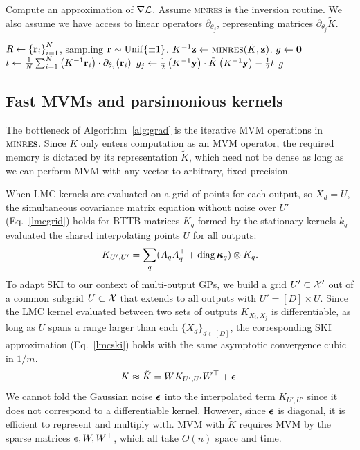 \documentclass[twoside]{article}
\begin{document}
\begin{algorithm}[!ht]
  \caption{Compute an approximation of $\nabla \mathcal{L}$. Assume \textsc{minres} is the inversion routine. We also assume we have access to linear operators $\partial_{\theta_j}$, representing matrices $\partial_{\theta_j}\tilde{K}$.} \label{alg:grad}
\begin{algorithmic}[1]
  \State $R\gets\left\{ {\textbf{r}}_i \right\}_{ i=1 }^{ N }$, sampling ${\textbf{r}}\sim\operatorname{Unif}\{\pm 1\}$.
\State $K^{-1}\textbf{z}\gets\textsc{minres}(\tilde{K},\textbf{z})$.
\EndFor
\State $g\gets \textbf{0}$
\State $t\gets \frac{1}{N}\sum_{i=1}^{N}\left({K^{-1}{\textbf{r}}_i}\right)\cdot \partial_{\theta_j}({\textbf{r}}_i)$
\State $g_j\gets \frac{1}{2}\left({K^{-1}\textbf{y}}\right)\cdot \tilde{K}\left({K^{-1}\textbf{y}}\right)-\frac{1}{2}t$
\EndFor
\State \Return $g$ 
\EndProcedure
\end{algorithmic}
\end{algorithm}

\subsection{Fast MVMs and parsimonious kernels}\label{fast-mvm}

The bottleneck of Algorithm~\ref{alg:grad} is the iterative MVM operations in $\textsc{minres}$. Since $K$ only enters computation as an MVM operator, the required memory is dictated by its representation $\tilde{K}$, which need not be dense as long as we can perform MVM with any vector to arbitrary, fixed precision.

When LMC kernels are evaluated on a grid of points for each output, so $X_d=U$, the simultaneous covariance matrix equation without noise over ${U'}$  (Eq.~\ref{lmcgrid}) holds for BTTB matrices $K_q$ formed by the stationary kernels $k_q$ evaluated the shared interpolating points $U$ for all outputs:
\begin{align}
  K_{{U'},{U'}}=\sum_q(A_qA_q^\top+\operatorname{diag}{\boldsymbol\kappa}_q)\otimes K_q\label{lmcgrid}.
\end{align}
To adapt SKI to our context of multi-output GPs, we build a grid ${U'}\subset\mathcal{X}'$ out of a common subgrid $U\subset\mathcal{X}$ that extends to all outputs with ${U'} = [D]\times U$. Since the LMC kernel evaluated between two sets of outputs $K_{X_i,X_j}$ is differentiable, as long as $U$ spans a range larger than each $\{X_d\}_{d\in[D]}$, the corresponding SKI approximation (Eq.~\ref{lmcski}) holds with the same asymptotic convergence cubic in $1/m$.
\begin{align}
  K\approx \tilde{K}=WK_{{U'},{U'}}W^\top+{\boldsymbol\epsilon}.\label{lmcski}
\end{align}
We cannot fold the Gaussian noise ${\boldsymbol\epsilon}$ into the interpolated term $K_{{U'},{U'}}$ since it does not correspond to a differentiable kernel. However, since ${\boldsymbol\epsilon}$ is diagonal, it is efficient to represent and multiply with. MVM with $\tilde{K}$ requires MVM by the sparse matrices ${\boldsymbol\epsilon}, W,W^\top$, which all take $O(n)$ space and time.
\end{document}
